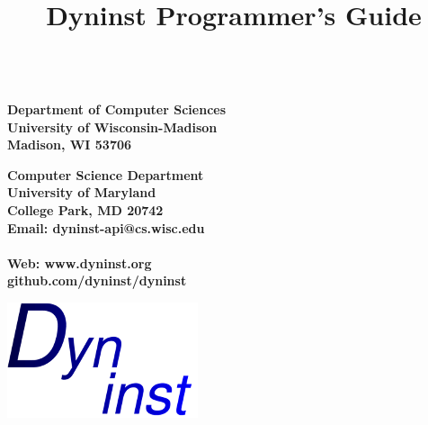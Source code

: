 \documentclass[twopages,a4paper]{article}
\title{Dyninst Programmer's Guide}
\begin{document}
\lstset{showstringspaces=false}
\begin{titlepage}
{\centering\fontsize{20}{60}}


\vspace*{5em}
\begin{minipage}{0.5\textwidth}
\mbox{}\\ 
\textbf{\large Department of Computer Sciences \\ 
University of Wisconsin-Madison \\
Madison, WI 53706}
\end{minipage}

\begin{minipage}{0.5\textwidth}
\textbf{\large Computer Science Department\\
University of Maryland\\
College Park, MD 20742\\
\small Email: dyninst-api@cs.wisc.edu\\\\
Web: www.dyninst.org\\
\indent \indent github.com/dyninst/dyninst}
\end{minipage}
\begin{minipage}{0.3\textwidth}
	\includegraphics{logo}
\end{minipage}




\end{titlepage}

\newlength\tindent
\setlength{\tindent}{\parindent}
\setlength{\parindent}{0pt}
\renewcommand{\indent}{\hspace*{\tindent}}
\end{document}

